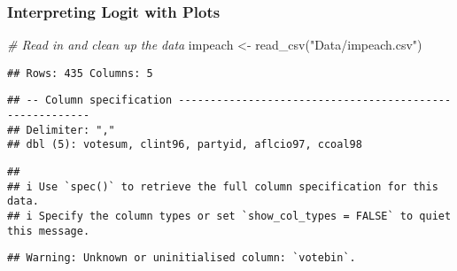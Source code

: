\documentclass[
]{article}
\newenvironment{Shaded}{\begin{snugshade}}{\end{snugshade}}
\newcommand{\CommentTok}[1]{\textcolor[rgb]{0.56,0.35,0.01}{\textit{#1}}}
\newcommand{\DecValTok}[1]{\textcolor[rgb]{0.00,0.00,0.81}{#1}}
\newcommand{\FunctionTok}[1]{\textcolor[rgb]{0.00,0.00,0.00}{#1}}
\newcommand{\NormalTok}[1]{#1}
\newcommand{\OtherTok}[1]{\textcolor[rgb]{0.56,0.35,0.01}{#1}}
\newcommand{\SpecialCharTok}[1]{\textcolor[rgb]{0.00,0.00,0.00}{#1}}
\newcommand{\StringTok}[1]{\textcolor[rgb]{0.31,0.60,0.02}{#1}}
\begin{document}
\hypertarget{interpreting-logit-with-plots}{%
\subsubsection{Interpreting Logit with
Plots}\label{interpreting-logit-with-plots}}

\begin{Shaded}
\begin{Highlighting}[]
\CommentTok{\# Read in and clean up the data}
\NormalTok{impeach }\OtherTok{\textless{}{-}} \FunctionTok{read\_csv}\NormalTok{(}\StringTok{"Data/impeach.csv"}\NormalTok{)}
\end{Highlighting}
\end{Shaded}

\begin{verbatim}
## Rows: 435 Columns: 5
\end{verbatim}

\begin{verbatim}
## -- Column specification --------------------------------------------------------
## Delimiter: ","
## dbl (5): votesum, clint96, partyid, aflcio97, ccoal98
\end{verbatim}

\begin{verbatim}
## 
## i Use `spec()` to retrieve the full column specification for this data.
## i Specify the column types or set `show_col_types = FALSE` to quiet this message.
\end{verbatim}

\begin{Shaded}
\end{Shaded}

\begin{verbatim}
## Warning: Unknown or uninitialised column: `votebin`.
\end{verbatim}
\end{document}
